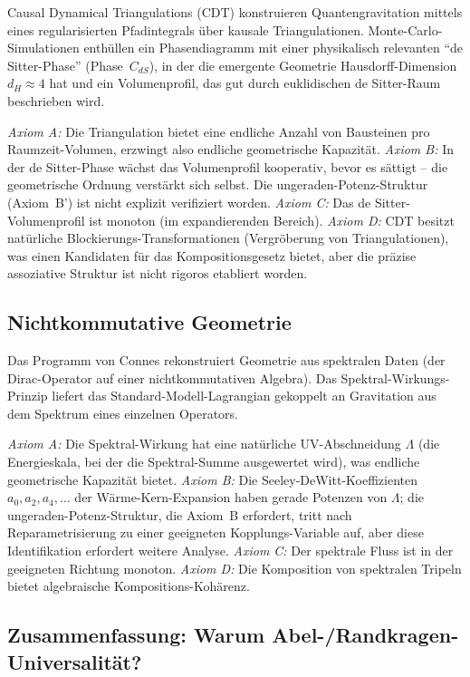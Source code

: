 \documentclass[aps,prd,twocolumn,superscriptaddress,nofootinbib]{revtex4-2}
\begin{document}
Causal Dynamical Triangulations (CDT) \cite{Ambjorn2005,Loll2020} konstruieren Quantengravitation mittels eines regularisierten Pfadintegrals über kausale Triangulationen. Monte-Carlo-Simulationen enthüllen ein Phasendiagramm mit einer physikalisch relevanten ``de Sitter-Phase'' (Phase~$C_{dS}$), in der die emergente Geometrie Hausdorff-Dimension $d_H \approx 4$ hat und ein Volumenprofil, das gut durch euklidischen de Sitter-Raum beschrieben wird.

\textit{Axiom A:} Die Triangulation bietet eine endliche Anzahl von Bausteinen pro Raumzeit-Volumen, erzwingt also endliche geometrische Kapazität. \textit{Axiom B:} In der de Sitter-Phase wächst das Volumenprofil kooperativ, bevor es sättigt -- die geometrische Ordnung verstärkt sich selbst. Die ungeraden-Potenz-Struktur (Axiom~B') ist nicht explizit verifiziert worden. \textit{Axiom C:} Das de Sitter-Volumenprofil ist monoton (im expandierenden Bereich). \textit{Axiom D:} CDT besitzt natürliche Blockierungs-Transformationen (Vergröberung von Triangulationen), was einen Kandidaten für das Kompositionsgesetz bietet, aber die präzise assoziative Struktur ist nicht rigoros etabliert worden.

\subsection{Nichtkommutative Geometrie}

Das Programm von Connes \cite{Connes1994} rekonstruiert Geometrie aus spektralen Daten (der Dirac-Operator auf einer nichtkommutativen Algebra). Das Spektral-Wirkungs-Prinzip liefert das Standard-Modell-Lagrangian gekoppelt an Gravitation aus dem Spektrum eines einzelnen Operators.

\textit{Axiom A:} Die Spektral-Wirkung hat eine natürliche UV-Abschneidung $\Lambda$ (die Energieskala, bei der die Spektral-Summe ausgewertet wird), was endliche geometrische Kapazität bietet. \textit{Axiom B:} Die Seeley-DeWitt-Koeffizienten $a_0, a_2, a_4, \ldots$ der Wärme-Kern-Expansion haben gerade Potenzen von $\Lambda$; die ungeraden-Potenz-Struktur, die Axiom~B erfordert, tritt nach Reparametrisierung zu einer geeigneten Kopplungs-Variable auf, aber diese Identifikation erfordert weitere Analyse. \textit{Axiom C:} Der spektrale Fluss ist in der geeigneten Richtung monoton. \textit{Axiom D:} Die Komposition von spektralen Tripeln bietet algebraische Kompositions-Kohärenz.

\subsection{Zusammenfassung: Warum Abel-/Randkragen-Universalität?}
\end{document}
